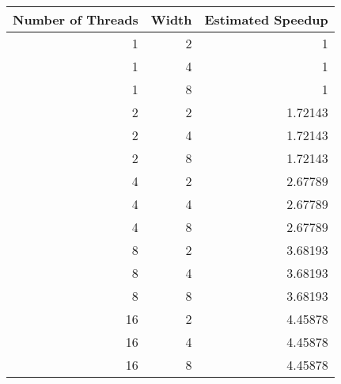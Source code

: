 \begin{tabular}{rrr}
\hline
   Number of Threads &   Width &   Estimated Speedup \\
\hline
                   1 &       2 &             1       \\
                   1 &       4 &             1       \\
                   1 &       8 &             1       \\
                   2 &       2 &             1.72143 \\
                   2 &       4 &             1.72143 \\
                   2 &       8 &             1.72143 \\
                   4 &       2 &             2.67789 \\
                   4 &       4 &             2.67789 \\
                   4 &       8 &             2.67789 \\
                   8 &       2 &             3.68193 \\
                   8 &       4 &             3.68193 \\
                   8 &       8 &             3.68193 \\
                  16 &       2 &             4.45878 \\
                  16 &       4 &             4.45878 \\
                  16 &       8 &             4.45878 \\
\hline
\end{tabular}